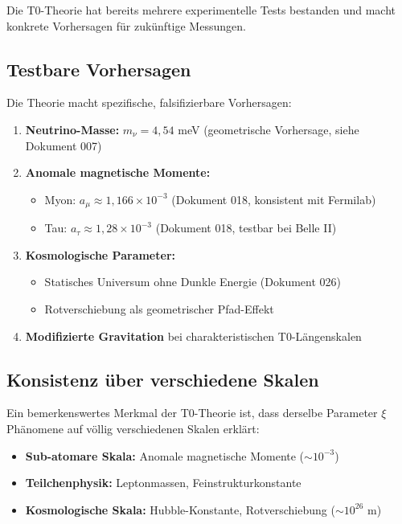 	Die T0-Theorie hat bereits mehrere experimentelle Tests bestanden und macht konkrete Vorhersagen für zukünftige Messungen.
	
	\subsection{Testbare Vorhersagen}
	
	\begin{keyresult}
		Die Theorie macht spezifische, falsifizierbare Vorhersagen:
		\begin{enumerate}
			\item \textbf{Neutrino-Masse:} $m_\nu = 4{,}54$ meV (geometrische Vorhersage, siehe Dokument 007)
			
			\item \textbf{Anomale magnetische Momente:}
			\begin{itemize}
				\item Myon: $a_\mu \approx 1{,}166 \times 10^{-3}$ (Dokument 018, konsistent mit Fermilab)
				\item Tau: $a_\tau \approx 1{,}28 \times 10^{-3}$ (Dokument 018, testbar bei Belle II)
			\end{itemize}
			
			\item \textbf{Kosmologische Parameter:}
			\begin{itemize}
				\item Statisches Universum ohne Dunkle Energie (Dokument 026)
				\item Rotverschiebung als geometrischer Pfad-Effekt
			\end{itemize}
			
			\item \textbf{Modifizierte Gravitation} bei charakteristischen T0-Längenskalen
		\end{enumerate}
	\end{keyresult}
	
	\subsection{Konsistenz über verschiedene Skalen}
	
	Ein bemerkenswertes Merkmal der T0-Theorie ist, dass derselbe Parameter $\xi$ Phänomene auf völlig verschiedenen Skalen erklärt:
	
	\begin{itemize}
		\item \textbf{Sub-atomare Skala:} Anomale magnetische Momente ($\sim 10^{-3}$)
		\item \textbf{Teilchenphysik:} Leptonmassen, Feinstrukturkonstante
		\item \textbf{Kosmologische Skala:} Hubble-Konstante, Rotverschiebung ($\sim 10^{26}$ m)
	\end{itemize}
	
